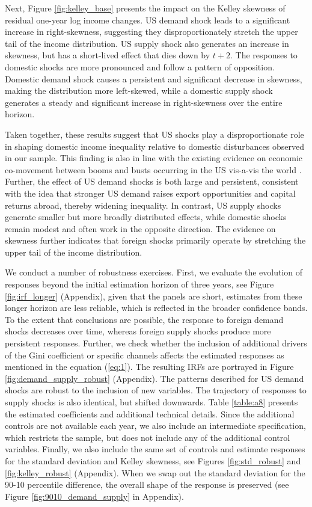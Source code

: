 \documentclass[12pt, a4paper]{article}
\begin{document}
Next, Figure \ref{fig:kelley_base} presents the impact on the Kelley skewness of residual one-year log income changes. US demand shock leads to a significant increase in right-skewness, suggesting they disproportionately stretch the upper tail of the income distribution. US supply shock also generates an increase in skewness, but has a short-lived effect that dies down by $t+2$. The responses to domestic shocks are more pronounced and follow a pattern of opposition. Domestic demand shock causes a persistent and significant decrease in skewness, making the distribution more left-skewed, while a domestic supply shock generates a steady and significant increase in right-skewness over the entire horizon.

Taken together, these results suggest that US shocks play a disproportionate role in shaping domestic income inequality relative to domestic disturbances observed in our sample. This finding is also in line with the existing evidence on economic co-movement between booms and busts occurring in the US vis-a-vis the world \parencite{Kose2003, Kose2012, Fink2015}. Further, the effect of US demand shocks is both large and persistent, consistent with the idea that stronger US demand raises export opportunities and capital returns abroad, thereby widening inequality. In contrast, US supply shocks generate smaller but more broadly distributed effects, while domestic shocks remain modest and often work in the opposite direction. The evidence on skewness further indicates that foreign shocks primarily operate by stretching the upper tail of the income distribution.

We conduct a number of robustness exercises. First, we evaluate the evolution of responses beyond the initial estimation horizon of three years, see Figure \ref{fig:irf_longer} (Appendix), given that the panels are short, estimates from these longer horizon are less reliable, which is reflected in the broader confidence bands. To the extent that conclusions are possible, the response to foreign demand shocks decreases over time, whereas foreign supply shocks produce more persistent responses. Further, we check whether the inclusion of additional drivers of the Gini coefficient or specific channels affects the estimated responses as mentioned in the equation (\ref{eq:1}). The resulting IRFs are portrayed in Figure \ref{fig:demand_supply_robust} (Appendix). The patterns described for US demand shocks are robust to the inclusion of new variables. The trajectory of responses to supply shocks is also identical, but shifted downwards. Table \ref{table:a8} presents the estimated coefficients and additional technical details. Since the additional controls are not available each year, we also include  an intermediate specification, which restricts the sample, but does not include any of the additional control variables. Finally, we also include the same set of controls and estimate responses for the standard deviation and Kelley skewness, see Figures \ref{fig:std_robust} and \ref{fig:kelley_robust} (Appendix). When we swap out the standard deviation for the 90-10 percentile difference, the overall shape of the response is preserved (see Figure \ref{fig:9010_demand_supply} in Appendix).
\end{document}
